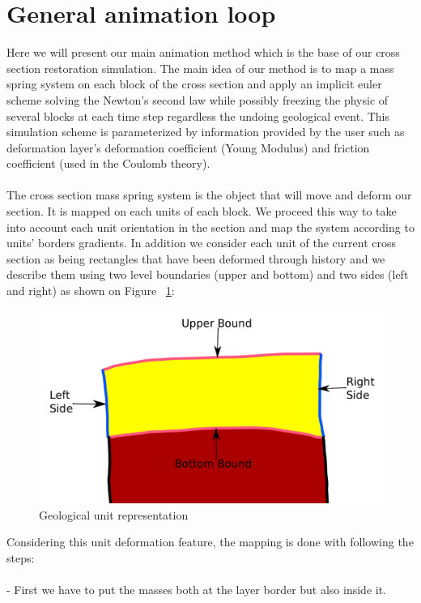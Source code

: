 \documentclass[12pt, a4paper]{report} %
\begin{document}
\section{General animation loop}
\label{sec:generalanimation}
Here we will present our main animation method which is the base of our cross section restoration simulation. 
The main idea of our method is to map a mass spring system on each block of the cross section and apply an implicit euler scheme solving the Newton's second law while possibly freezing the physic of several blocks at each time step regardless the undoing geological event. 
This simulation scheme is parameterized by information provided by the user such as deformation layer's deformation coefficient (Young Modulus) and friction coefficient (used in the Coulomb theory).\\\\
The cross section mass spring system is the object that will move and deform our section. It is mapped on each units of each block. We proceed this way to take into account each unit orientation in the section and map the system according to units' borders gradients. In addition we consider each unit of the current cross section as being rectangles that have been deformed through history and we describe them using two level boundaries (upper and bottom) and two sides (left and right) as shown on Figure ~\ref{unitdecr}:
 \begin{figure}[H]
	\centering
	\includegraphics[scale=0.3]{unitDescriptionEdit.png}
	\caption{Geological unit representation}
	\label{unitdecr}
\end{figure}
Considering this unit deformation feature, the mapping is done with following the steps:	\\\\		
\indent	- First we have to put the masses both at the layer border but also inside it.\\\\
\end{document}

